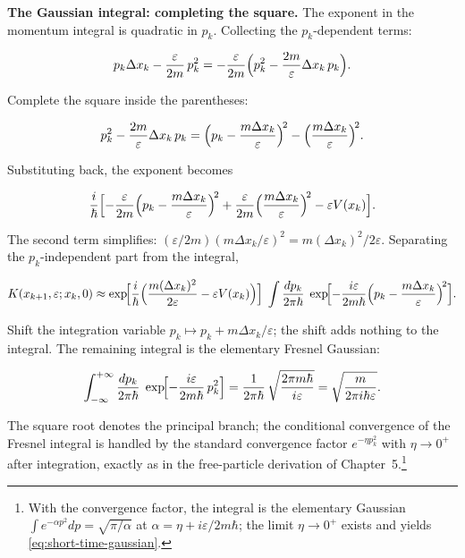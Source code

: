 \medskip\noindent\textbf{The Gaussian integral: completing the square.} The exponent in the momentum integral is quadratic in $p_k$. Collecting the $p_k$-dependent terms:
\begin{linenomath}
\begin{equation*}
p_k\Delta x_k - \frac{\varepsilon}{2m}\,p_k^2
= -\frac{\varepsilon}{2m}\Bigl(p_k^2 - \frac{2m}{\varepsilon}\Delta x_k\,p_k\Bigr) .
\end{equation*}
\end{linenomath}
Complete the square inside the parentheses:
\begin{linenomath}
\begin{equation*}
p_k^2 - \frac{2m}{\varepsilon}\Delta x_k\,p_k
= \Bigl(p_k - \frac{m\Delta x_k}{\varepsilon}\Bigr)^{\!2}
   - \Bigl(\frac{m\Delta x_k}{\varepsilon}\Bigr)^{\!2} .
\end{equation*}
\end{linenomath}
Substituting back, the exponent becomes
\begin{linenomath}
\begin{equation*}
\frac{i}{\hbar}\Bigl[-\frac{\varepsilon}{2m}\Bigl(p_k - \frac{m\Delta x_k}{\varepsilon}\Bigr)^{\!2}
   + \frac{\varepsilon}{2m}\Bigl(\frac{m\Delta x_k}{\varepsilon}\Bigr)^{\!2}
   - \varepsilon V(x_k)\Bigr] .
\end{equation*}
\end{linenomath}
The second term simplifies: $(\varepsilon/2m)(m\Delta x_k/\varepsilon)^2 = m(\Delta x_k)^2/2\varepsilon$. Separating the $p_k$-independent part from the integral,
\begin{linenomath}
\begin{equation}
K(x_{k+1},\varepsilon; x_k,0)
\approx \exp\!\Bigl[\frac{i}{\hbar}\Bigl(\frac{m(\Delta x_k)^2}{2\varepsilon} - \varepsilon V(x_k)\Bigr)\Bigr]\;
\int \frac{dp_k}{2\pi\hbar}\;
\exp\!\Bigl[-\frac{i\varepsilon}{2m\hbar}\Bigl(p_k - \frac{m\Delta x_k}{\varepsilon}\Bigr)^{\!2}\Bigr] .
\end{equation}
\end{linenomath}
Shift the integration variable $p_k \mapsto p_k + m\Delta x_k/\varepsilon$; the shift adds nothing to the integral. The remaining integral is the elementary Fresnel Gaussian:
\begin{linenomath}
\begin{equation}
\int_{-\infty}^{+\infty} \frac{dp_k}{2\pi\hbar}\;
\exp\!\Bigl[-\frac{i\varepsilon}{2m\hbar}\,p_k^2\Bigr]
= \frac{1}{2\pi\hbar}\,\sqrt{\frac{2\pi m\hbar}{i\varepsilon}}
= \sqrt{\frac{m}{2\pi i\hbar\varepsilon}} .
\label{eq:short-time-gaussian}
\end{equation}
\end{linenomath}
The square root denotes the principal branch; the conditional convergence of the Fresnel integral is handled by the standard convergence factor $e^{-\eta p_k^2}$ with $\eta \to 0^{+}$ after integration, exactly as in the free-particle derivation of Chapter~5.\footnote{With the convergence factor, the integral is the elementary Gaussian $\int e^{-\alpha p^2}dp = \sqrt{\pi/\alpha}$ at $\alpha = \eta + i\varepsilon/2m\hbar$; the limit $\eta \to 0^{+}$ exists and yields \eqref{eq:short-time-gaussian}.}


